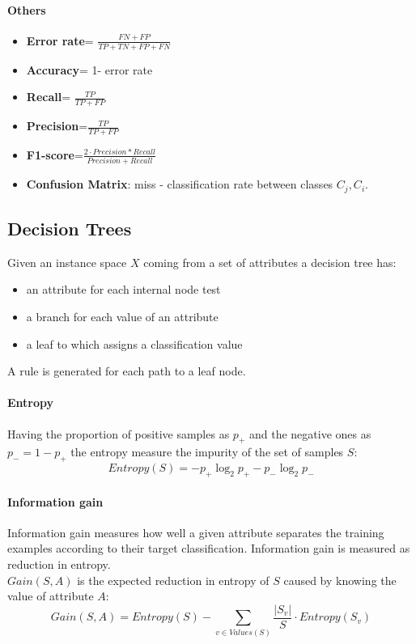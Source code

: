 \paragraph{Others}
\begin{itemize}
\item \textbf{Error rate}= $\frac{FN+FP}{TP+TN+FP+FN}$
\item \textbf{Accuracy}= 1- error rate
\item \textbf{Recall}= $\frac{TP}{TP+FP}$
\item \textbf{Precision}=$\frac{TP}{TP+FP}$
\item \textbf{F1-score}=$\frac{2 \cdot Precision * Recall}{Precision + Recall}$
\item \textbf{Confusion Matrix}: miss - classification rate between classes $C_j,C_i$.
\end{itemize}

\subsection{Decision Trees}
Given an instance space $X$ coming from a set of attributes a decision tree has: 
\begin{itemize}
\item an attribute for each internal node test
\item a branch for each  value of an attribute
\item a leaf to which assigns a classification value
\end{itemize}
A rule is generated for each path to a leaf node. 


\paragraph{Entropy}
Having the proportion of positive samples as $p_+$ and the negative ones as $p_-=1-p_+$ the entropy measure the impurity of the set of samples $S$:
\[Entropy(S)=-p_+\log_2p_+-p_-\log_2p_-\]




\paragraph{Information gain}
Information gain measures how well a given attribute separates the training examples according to their target classification. Information gain is measured as reduction in entropy.\\
$Gain(S,A)$ is the expected reduction in entropy of $S$ caused by knowing the value of attribute $A$:
\[Gain(S,A)=Entropy(S)-\sum_{v \in Values(S)}\frac{|S_v|}{S}\cdot Entropy(S_v)\] 


